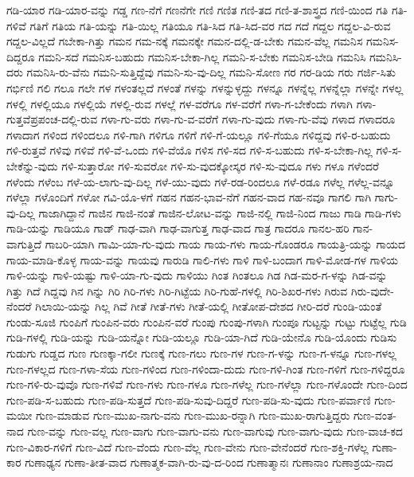 {ಗಡಿ-ಯಾರ
ಗಡಿ-ಯಾರ-ವನ್ನು
ಗಡ್ಡ
ಗಣ-ನೆಗೆ
ಗಣನೆಗೇ
ಗಣಿ
ಗಣಿತ
ಗಣಿ-ತದ
ಗಣಿ-ತ-ಶಾಸ್ತ್ರದ
ಗಣಿ-ಯಿಂದ
ಗತಿ
ಗತಿ-ಗಳಿವೆ
ಗತಿಗೆ
ಗತಿಯ
ಗತಿ-ಯನ್ನು
ಗತಿ-ಯಿಲ್ಲ
ಗತಿಯೂ
ಗತಿ-ಸಿದ
ಗತಿ-ಸಿದ-ವರ
ಗದ
ಗದೆ
ಗದ್ದಲ
ಗದ್ದಲ-ವಿ-ರುವ
ಗದ್ದಲ-ವಿಲ್ಲದೆ
ಗಬೇಕಾ-ಗಿತ್ತು
ಗಮನ
ಗಮ-ನಕ್ಕೆ
ಗಮನಕ್ಕೇ
ಗಮನ-ದಲ್ಲಿ-ಡ-ಬೇಕು
ಗಮನ-ವೆಲ್ಲ
ಗಮನಿಸ
ಗಮನಿಸ-ದಿದ್ದರೂ
ಗಮನಿ-ಸದೆ
ಗಮನಿಸ-ಬಹುದು
ಗಮನಿಸ-ಬೇಕಾ-ಗಿಲ್ಲ
ಗಮನಿ-ಸ-ಬೇಕು
ಗಮನಿಸ-ಬೇಡಿ
ಗಮನಿಸಿ
ಗಮನಿಸಿ-ದರು
ಗಮನಿಸಿ-ರು-ವೆನು
ಗಮನಿ-ಸುತ್ತಿದ್ದೆವು
ಗಮನಿ-ಸು-ವು-ದಿಲ್ಲ
ಗಮನಿ-ಸೋಣ
ಗರ
ಗರ-ಡಿಯ
ಗರು
ಗರ್ಜಿ-ಸಿತು
ಗರ್ಭಿಣಿ
ಗಲಿ
ಗಲೂ
ಗಲೇ
ಗಳ
ಗಳಂತಲ್ಲದೆ
ಗಳಂತೆ
ಗಳನ್ನು
ಗಳನ್ನುಳ್ಳದ್ದು
ಗಳನ್ನೂ
ಗಳನ್ನೆಲ್ಲ
ಗಳನ್ನೆಲ್ಲಾ
ಗಳನ್ನೇ
ಗಳಲ್ಲ
ಗಳಲ್ಲಿ
ಗಳಲ್ಲಿಯೂ
ಗಳಲ್ಲಿಯೆ
ಗಳಲ್ಲಿ-ರುವ
ಗಳಲ್ಲೆ
ಗಳ-ವರೆಗೂ
ಗಳ-ವರೆಗೆ
ಗಳಾ-ಗ-ಬೇಕೆಂದು
ಗಳಾಗಿ
ಗಳಾ-ಗುತ್ತವೆಪ್ರಪಂಚ-ದಲ್ಲಿ-ರುವ
ಗಳಾ-ಗು-ವರು
ಗಳಾ-ಗು-ವ-ವರೆಗೆ
ಗಳಾ-ಗು-ವುದು
ಗಳಾ-ಗು-ವೆವು
ಗಳಾದ
ಗಳಾದರೂ
ಗಳಾದಾಗ
ಗಳಿಂದ
ಗಳಿಂದಲೂ
ಗಳಿ-ಗಾಗಿ
ಗಳಿಗೂ
ಗಳಿಗೆ
ಗಳಿ-ಗೆ-ಯಲ್ಲೂ
ಗಳಿ-ಗೆಯೂ
ಗಳಿದ್ದವು
ಗಳಿ-ರ-ಬಹುದು
ಗಳಿ-ರುತ್ತವೆ
ಗಳಿವು
ಗಳಿವೆ
ಗಳಿ-ವೆ-ಒಂದು
ಗಳಿ-ವೆಯೊ
ಗಳಿಸ
ಗಳಿ-ಸದ
ಗಳಿ-ಸ-ಬಹುದು
ಗಳಿ-ಸ-ಬೇಕಾ-ಗಿಲ್ಲ
ಗಳಿ-ಸ-ಬೇಕೆನ್ನು-ವುದು
ಗಳಿ-ಸುತ್ತಾರೋ
ಗಳಿ-ಸುವರೋ
ಗಳಿ-ಸು-ವುದಕ್ಕೋಸ್ಕರ
ಗಳಿ-ಸು-ವುದೂ
ಗಳು
ಗಳೂ
ಗಳೆಂದರೆ
ಗಳೆಂದು
ಗಳೆಂಬ
ಗಳೆ-ಯ-ಲಾಗು-ವು-ದಿಲ್ಲ
ಗಳೆ-ಯು-ವುದು
ಗಳೆ-ರಡ-ರಿಂದಲೂ
ಗಳೆ-ರಡೂ
ಗಳೆಲ್ಲ
ಗಳೆಲ್ಲ-ವನ್ನೂ
ಗಳೆಲ್ಲಾ
ಗಳೊಂದಿಗೆ
ಗಳೋ
ಗವಿ-ಯೊ-ಳಗೆ
ಗಹನ
ಗಹನ-ಭಾವ-ನೆಗೆ
ಗಹನ-ವಾದ
ಗಹ-ನವೂ
ಗಾಗಲಿ
ಗಾಗಿ
ಗಾಗು-ವು-ದಿಲ್ಲ
ಗಾಜಾಗಿದ್ದಾನೆ
ಗಾಜಿನ
ಗಾಜಿ-ನಂತೆ
ಗಾಜಿನ-ಲೋಟ-ವನ್ನು
ಗಾಜಿ-ನಲ್ಲಿ
ಗಾಜಿ-ನಿಂದ
ಗಾಜು
ಗಾಡಿ
ಗಾಡಿ-ಗಳು
ಗಾಡಿ-ಯನ್ನು
ಗಾಡಿಯೂ
ಗಾಡ್
ಗಾಢ-ವಾಗಿ
ಗಾಢ-ವಾಗುತ್ತ
ಗಾಢ-ವಾದ
ಗಾತ್ರ
ಗಾದರೂ
ಗಾನಲ-ಹರಿ
ಗಾನ-ವಾಗುತ್ತಿದೆ
ಗಾಬರಿ-ಯಾಗಿ
ಗಾಮಿ-ಯಾ-ಗು-ವುದು
ಗಾಯ
ಗಾಯ-ಗಳು
ಗಾಯ-ಗೊಂಡರೂ
ಗಾಯತ್ರಿ-ಯನ್ನು
ಗಾಯದ
ಗಾಯ-ಮಾಡಿ-ಕೊಳ್ಳ
ಗಾಯ-ವನ್ನು
ಗಾಯವು
ಗಾರುಡಿ
ಗಾಲಿ-ಗಳು
ಗಾಳಿ
ಗಾಳಿ-ಬಂದಾಗ
ಗಾಳಿ-ಮೋಡ-ಗಳ
ಗಾಳಿಯ
ಗಾಳಿ-ಯನ್ನು
ಗಾಳಿ-ಯಷ್ಟು
ಗಾಳಿ-ಯಾ-ಗು-ವುದು
ಗಾಳಿಯು
ಗಿಂತ
ಗಿಂತಲೂ
ಗಿಡ
ಗಿಡ-ಮರ-ಗ-ಳನ್ನು
ಗಿಡ-ವನ್ನು
ಗಿತ್ತು
ಗಿದೆ
ಗಿದ್ದವು
ಗಿನ
ಗಿನ್ನು
ಗಿರಿ
ಗಿರಿ-ಗಳು
ಗಿರಿ-ಗಿಟ್ಟೆಯ
ಗಿರಿ-ಗುಹೆ-ಗಳಲ್ಲಿ
ಗಿರಿ-ಶಿಖರ-ಗಳು
ಗಿರುವ
ಗಿರು-ವುದೇ-ನೆಂದರೆ
ಗಿಲಾಯಿ-ಯನ್ನು
ಗಿಲ್ಲ
ಗಿವೆ
ಗೀತೆ
ಗೀತೆ-ಗಳು
ಗೀತೆ-ಯಲ್ಲಿ
ಗೀತೋಪ-ದೇಶದ
ಗೀರಿ-ದರೆ
ಗುಂಡಿ-ಯಂತೆ
ಗುಂಡು-ಸೂಜಿ
ಗುಂಪಿಗೆ
ಗುಂಪಿನ-ವರು
ಗುಂಪಿನ-ವರೆ
ಗುಂಪು
ಗುಂಪು-ಗಳಾಗಿ
ಗುಂಪೂ
ಗುಟ್ಟನ್ನು
ಗುಟ್ಟು
ಗುಟ್ಟೆಲ್ಲ
ಗುಡಿ
ಗುಡಿ-ಗಳಲ್ಲಿ
ಗುಡಿ-ಯನ್ನು
ಗುಡಿ-ಯನ್ನೋ
ಗುಡಿ-ಯಲ್ಲೂ
ಗುಡಿ-ಯಾ-ಗಿದೆ
ಗುಡಿ-ಯೇನೊ
ಗುಡಿ-ಯೊಂದು
ಗುಡಿಸು
ಗುಡುಗು
ಗುಡ್ಡದ
ಗುಣ
ಗುಣಕ್ಕಾ-ಗಲೀ
ಗುಣಕ್ಕೆ
ಗುಣ-ಗಲು
ಗುಣ-ಗಳ
ಗುಣ-ಗ-ಳನ್ನು
ಗುಣ-ಗ-ಳನ್ನೂ
ಗುಣ-ಗಳಲ್ಲ
ಗುಣ-ಗಳಲ್ಲದ
ಗುಣ-ಗಳಾ-ಸೆಯ
ಗುಣ-ಗಳಿಂದ
ಗುಣ-ಗಳಿಂದಾ-ದುದು
ಗುಣ-ಗಳಿ-ಗಿಂತ
ಗುಣ-ಗಳಿಗೆ
ಗುಣ-ಗಳಿದ್ದರೂ
ಗುಣ-ಗಳಿ-ರು-ವುವೊ
ಗುಣ-ಗಳಿವೆ
ಗುಣ-ಗಳು
ಗುಣ-ಗಳೂ
ಗುಣ-ಗಳೆಲ್ಲ
ಗುಣ-ಗಳೆಲ್ಲಾ
ಗುಣ-ಗಳೊಂದೇ
ಗುಣ-ದಿಂದ
ಗುಣ-ಪಡಿ-ಸ-ಬಹುದು
ಗುಣ-ಪಡಿ-ಸುತ್ತದೆ
ಗುಣ-ಪಡಿ-ಸುವು-ದಿದ್ದರೆ
ಗುಣ-ಪಡಿ-ಸು-ವುದು
ಗುಣ-ಪರ್ವಾಣಿ
ಗುಣ-ಮಯೀ
ಗುಣ-ಮಾಡುವ
ಗುಣ-ಮುಖ-ನಾಗು-ವನು
ಗುಣ-ಮುಖ-ರನ್ನಾಗಿ
ಗುಣ-ಮುಖ-ರಾಗುತ್ತಿದ್ದರು
ಗುಣ-ವಂತ-ನಾದ
ಗುಣ-ವನ್ನು
ಗುಣ-ವಲ್ಲ
ಗುಣ-ವಾಗು
ಗುಣ-ವಾಗು-ವನು
ಗುಣ-ವಾಗುವು
ಗುಣ-ವಾಗು-ವುದು
ಗುಣ-ವಾಚ-ಕದ
ಗುಣ-ವಿಕಾರ-ಗಳಿಗೆ
ಗುಣ-ವಿದೆ
ಗುಣ-ವೆಂದು
ಗುಣ-ವೆಲ್ಲ
ಗುಣ-ವೇನು
ಗುಣ-ವೇನೆಂದರೆ
ಗುಣ-ಶಕ್ತಿ-ಗಳೆಲ್ಲ
ಗುಣಾ-ಕಾರ
ಗುಣಾಢ್ಯನ
ಗುಣಾ-ತೀತ-ವಾದ
ಗುಣಾತ್ಮಕ-ವಾಗಿ-ರು-ವು-ದ-ರಿಂದ
ಗುಣಾತ್ಮಾನಃ
ಗುಣಾನಾಂ
ಗುಣಾಶ್ರಯ-ನಾದ
}
